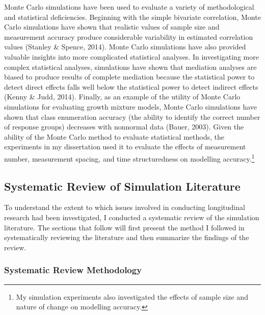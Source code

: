 \documentclass[
  english,
  man,floatsintext]{apa7}
\begin{document}
Monte Carlo simulations have been used to evaluate a variety of methodological and statistical deficiencies. Beginning with the simple bivariate correlation, Monte Carlo simulations have shown that realistic values of sample size and measurement accuracy produce considerable variability in estimated correlation values (Stanley \& Spence, 2014). Monte Carlo simulations have also provided valuable insights into more complicated statistical analyses. In investigating more complex statistical analyses, simulations have shown that mediation analyses are biased to produce results of complete mediation because the statistical power to detect direct effects falls well below the statistical power to detect indirect effects (Kenny \& Judd, 2014). Finally, as an example of the utility of Monte Carlo simulations for evaluating growth mixture models, Monte Carlo simulations have shown that class enumeration accuracy (the ability to identify the correct number of response groups) decreases with nonnormal data (Bauer, 2003). Given the ability of the Monte Carlo method to evaluate statistical methods, the experiments in my dissertation used it to evaluate the effects of measurement number, measurement spacing, and time structuredness on modelling accuracy.\footnote{My simulation experiments also investigated the effects of sample size and nature of change on modelling accuracy.}

\hypertarget{systematic-review-of-simulation-literature}{%
\subsection{Systematic Review of Simulation Literature}\label{systematic-review-of-simulation-literature}}

To understand the extent to which issues involved in conducting longitudinal research had been investigated, I conducted a systematic review of the simulation literature. The sections that follow will first present the method I followed in systematically reviewing the literature and then summarize the findings of the review.

\hypertarget{systematic-review-methodology}{%
\subsubsection{Systematic Review Methodology}\label{systematic-review-methodology}}
\end{document}

